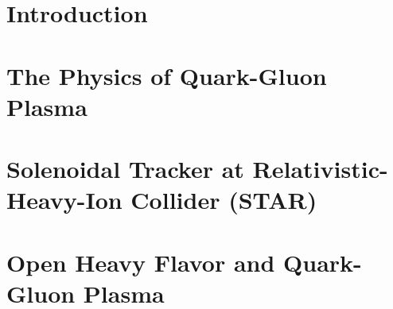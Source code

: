 \documentclass[a4paper,titlepage,11pt]{book} %
\newcommand{\Lambdac}{\ensuremath{\Lambda_\text{c}}}
\begin{document}
\thispagestyle{fancy}
\renewcommand{\footrulewidth}{0.4pt}


% 


\newpage
% 

\tableofcontents 
\pagestyle{fancy}
\fancyhead{} %
\fancyhead[RE]{\rightmark}
\fancyhead[LO]{\leftmark}

\renewcommand{\footrulewidth}{0.4pt}
\chapter{Introduction}
\setcounter{page}{1}


\chapter{The Physics of Quark-Gluon Plasma}




\chapter{Solenoidal Tracker at Relativistic-Heavy-Ion Collider (STAR)\label{STARchapter}}


\chapter{Open Heavy Flavor and Quark-Gluon Plasma}



\end{document}
